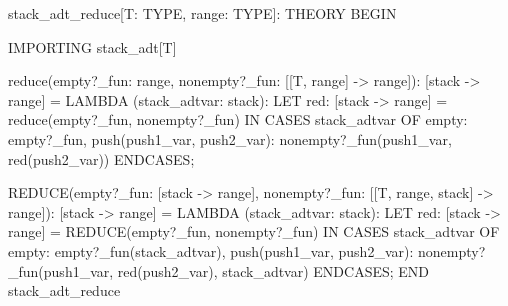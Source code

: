 stack_adt_reduce[T: TYPE, range: TYPE]: THEORY
 BEGIN

  IMPORTING stack_adt[T]

  reduce(empty?_fun: range, nonempty?_fun: [[T, range] -> range]):
  [stack -> range] =
      LAMBDA (stack_adtvar: stack):
        LET red: [stack -> range] = reduce(empty?_fun, nonempty?_fun) IN
          CASES stack_adtvar
            OF empty: empty?_fun,
               push(push1_var, push2_var):
                 nonempty?_fun(push1_var, red(push2_var))
            ENDCASES;

  REDUCE(empty?_fun: [stack -> range],
         nonempty?_fun: [[T, range, stack] -> range]):
   [stack -> range] =
      LAMBDA (stack_adtvar: stack):
        LET red: [stack -> range] = REDUCE(empty?_fun, nonempty?_fun) IN
          CASES stack_adtvar
            OF empty: empty?_fun(stack_adtvar),
               push(push1_var, push2_var):
                 nonempty?_fun(push1_var, red(push2_var), stack_adtvar)
            ENDCASES;
 END stack_adt_reduce